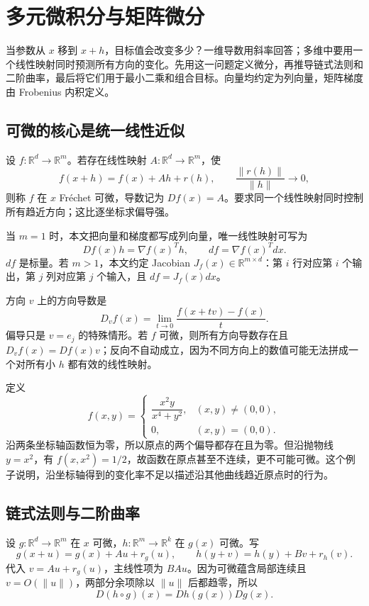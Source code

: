 \chapter{多元微积分与矩阵微分}
\label{ch:matrix-calculus}


当参数从 $x$ 移到 $x+h$，目标值会改变多少？一维导数用斜率回答；多维中要用一个线性映射同时预测所有方向的变化。先用这一问题定义微分，再推导链式法则和二阶曲率，最后将它们用于最小二乘和组合目标。向量均约定为列向量，矩阵梯度由 Frobenius 内积定义。

\section{可微的核心是统一线性近似}

设 $f:\mathbb R^d\to\mathbb R^m$。若存在线性映射 $A:\mathbb R^d\to\mathbb R^m$，使
\[
 f(x+h)=f(x)+Ah+r(h),
 \qquad
 \frac{\lVert r(h)\rVert}{\lVert h\rVert}\longrightarrow0,
\]
则称 $f$ 在 $x$ Fréchet 可微，导数记为 $Df(x)=A$。要求同一个线性映射同时控制所有趋近方向；这比逐坐标求偏导强。

当 $m=1$ 时，本文把向量和梯度都写成列向量，唯一线性映射可写为
\[
 Df(x)h=\nabla f(x)^Th,
 \qquad df=\nabla f(x)^Tdx.
\]
$df$ 是标量。若 $m>1$，本文约定 Jacobian $J_f(x)\in\mathbb R^{m\times d}$：第 $i$ 行对应第 $i$ 个输出，第 $j$ 列对应第 $j$ 个输入，且 $df=J_f(x)dx$。


方向 $v$ 上的方向导数是
\[
 D_vf(x)=\lim_{t\to0}\frac{f(x+tv)-f(x)}{t}.
\]
偏导只是 $v=e_j$ 的特殊情形。若 $f$ 可微，则所有方向导数存在且 $D_vf(x)=Df(x)v$；反向不自动成立，因为不同方向上的数值可能无法拼成一个对所有小 $h$ 都有效的线性映射。


定义
\[
 f(x,y)=
 \begin{cases}
 \dfrac{x^2y}{x^4+y^2},&(x,y)\neq(0,0),\\[4pt]
 0,&(x,y)=(0,0).
 \end{cases}
\]
沿两条坐标轴函数恒为零，所以原点的两个偏导都存在且为零。但沿抛物线 $y=x^2$，有 $f(x,x^2)=1/2$，故函数在原点甚至不连续，更不可能可微。这个例子说明，沿坐标轴得到的变化率不足以描述沿其他曲线趋近原点时的行为。

\section{链式法则与二阶曲率}

设 $g:\mathbb R^d\to\mathbb R^m$ 在 $x$ 可微，$h:\mathbb R^m\to\mathbb R^k$ 在 $g(x)$ 可微。写
\[
 g(x+u)=g(x)+Au+r_g(u),\qquad
 h(y+v)=h(y)+Bv+r_h(v).
\]
代入 $v=Au+r_g(u)$，主线性项为 $BAu$。因为可微蕴含局部连续且 $v=O(\lVert u\rVert)$，两部分余项除以 $\lVert u\rVert$ 后都趋零，所以
\[
 D(h\circ g)(x)=Dh(g(x))Dg(x).
\]

